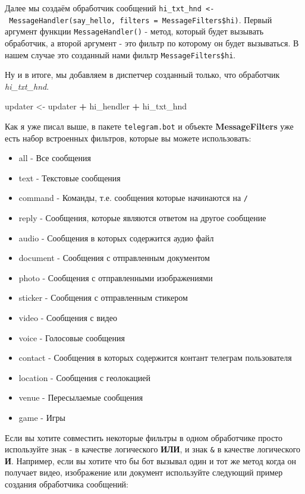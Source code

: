 \documentclass[
]{book}
\newenvironment{Shaded}{\begin{snugshade}}{\end{snugshade}}
\newcommand{\NormalTok}[1]{#1}
\newcommand{\OtherTok}[1]{\textcolor[rgb]{0.56,0.35,0.01}{#1}}
\newcommand{\SpecialCharTok}[1]{\textcolor[rgb]{0.81,0.36,0.00}{\textbf{#1}}}
\providecommand{\tightlist}{%
  \setlength{\itemsep}{0pt}\setlength{\parskip}{0pt}}
\begin{document}
Далее мы создаём обработчик сообщений \texttt{hi\_txt\_hnd\ \textless{}-\ MessageHandler(say\_hello,\ filters\ =\ MessageFilters\$hi)}. Первый аргумент функции \texttt{MessageHandler()} - метод, который будет вызывать обработчик, а второй аргумент - это фильтр по которому он будет вызываться. В нашем случае это созданный нами фильтр \texttt{MessageFilters\$hi}.

Ну и в итоге, мы добавляем в диспетчер созданный только, что обработчик \emph{hi\_txt\_hnd}.

\begin{Shaded}
\begin{Highlighting}[]
\NormalTok{updater }\OtherTok{\textless{}{-}}\NormalTok{ updater }\SpecialCharTok{+}
\NormalTok{             hi\_hendler }\SpecialCharTok{+}
\NormalTok{             hi\_txt\_hnd}
\end{Highlighting}
\end{Shaded}

Как я уже писал выше, в пакете \texttt{telegram.bot} и объекте \textbf{MessageFilters} уже есть набор встроенных фильтров, которые вы можете использовать:

\begin{itemize}
\tightlist
\item
  all - Все сообщения
\item
  text - Текстовые сообщения
\item
  command - Команды, т.е. сообщения которые начинаются на \texttt{/}
\item
  reply - Сообщения, которые являются ответом на другое сообщение
\item
  audio - Сообщения в которых содержится аудио файл
\item
  document - Сообщения с отправленным документом
\item
  photo - Сообщения с отправленными изображениями
\item
  sticker - Сообщения с отправленным стикером
\item
  video - Сообщения с видео
\item
  voice - Голосовые сообщения
\item
  contact - Сообщения в которых содержится контант телеграм пользователя
\item
  location - Сообщения с геолокацией
\item
  venue - Пересылаемые сообщения
\item
  game - Игры
\end{itemize}

Если вы хотите совместить некоторые фильтры в одном обработчике просто используйте знак \texttt{\textbar{}} - в качестве логического \textbf{ИЛИ}, и знак \texttt{\&} в качестве логического \textbf{И}. Например, если вы хотите что бы бот вызывал один и тот же метод когда он получает видео, изображение или документ используйте следующий пример создания обработчика сообщений:
\end{document}
